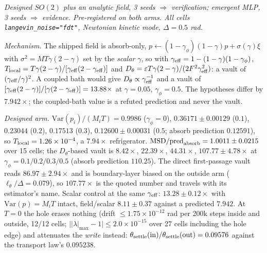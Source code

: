 \documentclass{article}
\begin{document}
\emph{Designed $SO(2)$ plus an analytic field, 3 seeds $\Rightarrow$ verification; emergent MLP, 3 seeds $\Rightarrow$ evidence. Pre-registered on both arms. All cells \texttt{langevin\_noise="fdt"}, Newtonian kinetic mode, $\Delta=0.5$ rad.}

\emph{Mechanism.} The shipped field is absorb-only, $p\leftarrow(1-\gamma_\phi)(1-\gamma)p+\sigma(\gamma)\xi$ with $\sigma^2=MT\gamma(2-\gamma)$ set by the \emph{scalar} $\gamma$, so with $\gamma_{\rm eff}=1-(1-\gamma)(1-\gamma_\phi)$, $T_{\rm local}=T\gamma(2-\gamma)/[\gamma_{\rm eff}(2-\gamma_{\rm eff})]$ and $D_\theta=\varepsilon T\gamma(2-\gamma)/(2F^2\gamma_{\rm eff}^2)$: a vault of $(\gamma_{\rm eff}/\gamma)^2$. A coupled bath would give $D_\theta\propto\gamma_{\rm eff}^{-1}$ and a vault of $[\gamma_{\rm eff}(2-\gamma)]/[\gamma(2-\gamma_{\rm eff})]=13.88\times$ at $\gamma=0.05$, $\gamma_\phi=0.5$. The hypotheses differ by $7.942\times$; the coupled-bath value is a refuted prediction and never the vault.

\emph{Designed arm.} $\mathrm{Var}(p_i)/(M_iT)=0.9986$ ($\gamma_\phi=0$), $0.36171\pm0.00129$ ($0.1$), $0.23044$ ($0.2$), $0.17513$ ($0.3$), $0.12600\pm0.00031$ ($0.5$; absorb prediction $0.12591$), so $T_{\rm local}=1.26\times10^{-4}$, a $7.94\times$ refrigerator. $\mathrm{MSD}/\text{pred}_{\rm absorb}=1.0011\pm0.0215$ over 15 cells; the $D_\theta$-based vault is $8.42\times$, $22.39\times$, $44.31\times$, $107.77\pm4.78\times$ at $\gamma_\phi=0.1/0.2/0.3/0.5$ (absorb prediction $110.25$). The direct first-passage vault reads $86.97\pm2.94\times$ and is boundary-layer biased on the outside arm ($\ell_\theta/\Delta=0.079$), so $107.77\times$ is the quoted number and travels with its estimator's name. Scalar control at the same $\gamma_{\rm eff}$: $13.28\pm0.12\times$ with $\mathrm{Var}(p)=M_iT$ intact, field/scalar $8.11\pm0.37$ against a predicted $7.942$. At $T=0$ the hole erases nothing (drift $\le1.75\times10^{-12}$ rad per 200k steps inside and outside, 12/12 cells; $\big||\lambda|_{\max}-1\big|\le2.0\times10^{-15}$ over 27 cells including the hole edge) and attenuates the \emph{write} instead: $\theta_{\rm settle}({\rm in})/\theta_{\rm settle}({\rm out})=0.09576$ against the transport law's $0.095238$.
\end{document}
